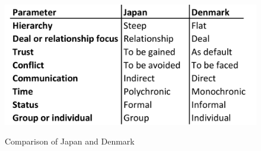 

\begin{figure}[H]
    \centering
    \caption{Comparison of Japan and Denmark}
    \includegraphics[width=12cm]{Appendix/CultureTable.png}
    \label{fig:my_label}
\end{figure}
